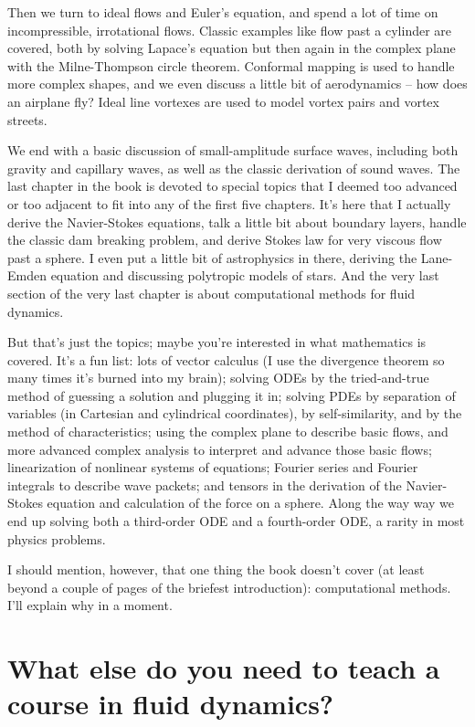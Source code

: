 \documentclass[10pt, a5paper, twoside, openany]{memoir}
\newcounter{example}[chapter]
\newcounter{problem}[chapter]
\begin{document}
Then we turn to ideal flows and Euler's equation, and spend a lot of time on incompressible, irrotational flows.  Classic examples like flow past a cylinder are covered, both by solving Lapace's equation but then again in the complex plane with the Milne-Thompson circle theorem.  Conformal mapping is used to handle more complex shapes, and we even discuss a little bit of aerodynamics -- how does an airplane fly?  Ideal line vortexes are used to model vortex pairs and vortex streets.

We end with a basic discussion of small-amplitude surface waves, including both gravity and capillary waves, as well as the classic derivation of sound waves.  The last chapter in the book is devoted to special topics that I deemed too advanced or too adjacent to fit into any of the first five chapters.  It's here that I actually derive the Navier-Stokes equations, talk a little bit about boundary layers, handle the classic dam breaking problem, and derive Stokes law for very viscous flow past a sphere.  I even put a little bit of astrophysics in there, deriving the Lane-Emden equation and discussing polytropic models of stars.  And the very last section of the very last chapter is about computational methods for fluid dynamics.

But that's just the topics; maybe you're interested in what mathematics is covered.  It's a fun list: lots of vector calculus (I use the divergence theorem so many times it's burned into my brain); solving ODEs by the tried-and-true method of guessing a solution and plugging it in; solving PDEs by separation of variables (in Cartesian and cylindrical coordinates), by self-similarity, and by the method of characteristics; using the complex plane to describe basic flows, and more advanced complex analysis to interpret and advance those basic flows; linearization of nonlinear systems of equations; Fourier series and Fourier integrals to describe wave packets; and tensors in the derivation of the Navier-Stokes equation and calculation of the force on a sphere.  Along the way way we end up solving both a third-order ODE and a fourth-order ODE, a rarity in most physics problems.

I should mention, however, that one thing the book doesn't cover (at least beyond a couple of pages of the briefest introduction): computational methods.  I'll explain why in a moment.

\section{What else do you need to teach a course in fluid dynamics?}
\end{document}
